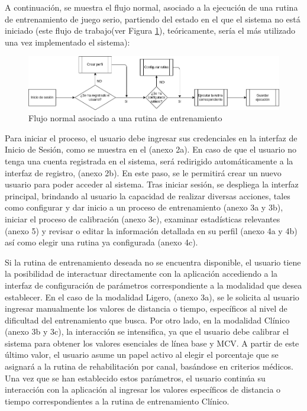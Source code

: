 A continuación, se muestra el flujo normal, asociado a la ejecución de una rutina de entrenamiento de juego serio, partiendo del estado en el que el sistema no está iniciado (este flujo de trabajo(ver Figura \ref{fig: diagram-flow}), teóricamente, sería el más utilizado una vez implementado el sistema):

\begin{figure}[ht]
    \centering
    \includegraphics[scale=0.5]{images/diagram-flow.png}
    \caption{Flujo normal asociado a una rutina de entrenamiento}
    \label{fig: diagram-flow}
\end{figure}

\newpage
Para iniciar el proceso, el usuario debe ingresar sus credenciales en la interfaz de Inicio de Sesión, como se muestra en el (anexo 2a). En caso de que el usuario no tenga una cuenta registrada en el sistema, será redirigido automáticamente a la interfaz de registro, (anexo 2b). En este paso, se le permitirá crear un nuevo usuario para poder acceder al sistema. Tras iniciar sesión, se despliega la interfaz principal, brindando al usuario la capacidad de realizar diversas acciones, tales como configurar y dar inicio a un proceso de entrenamiento (anexo 3a y 3b), iniciar el proceso de calibración (anexo 3c), examinar estadísticas relevantes (anexo 5) y revisar o editar la información detallada en su perfil (anexo 4a y 4b) así como elegir una rutina ya configurada (anexo 4c).

Si la rutina de entrenamiento deseada no se encuentra disponible, el usuario tiene la posibilidad de interactuar directamente con la aplicación accediendo a la interfaz de configuración de parámetros correspondiente a la modalidad que desea establecer. En el caso de la modalidad Ligero, (anexo 3a), se le solicita al usuario ingresar manualmente los valores de distancia o tiempo, específicos al nivel de dificultad del entrenamiento que busca. Por otro lado, en la modalidad Clínico (anexo 3b y 3c), la interacción se intensifica, ya que el usuario debe calibrar el sistema para obtener los valores esenciales de línea base y MCV. A partir de este último valor, el usuario asume un papel activo al elegir el porcentaje que se asignará a la rutina de rehabilitación por canal, basándose en criterios médicos. Una vez que se han establecido estos parámetros, el usuario continúa su interacción con la aplicación al ingresar los valores específicos de distancia o tiempo correspondientes a la rutina de entrenamiento Clínico. 

